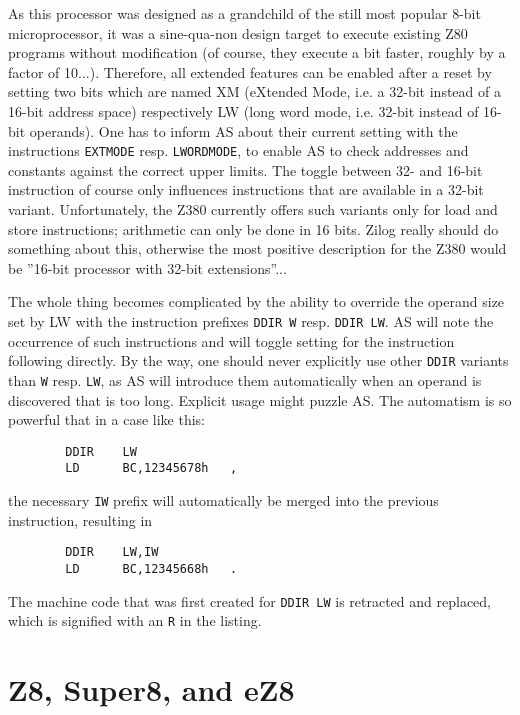 \documentclass[12pt,twoside]{report}
\newcommand{\tty}[1]{{\tt #1}}
\begin{document}
As this processor was designed as a grandchild of the still most popular
8-bit microprocessor, it was a sine-qua-non design target to execute
existing Z80 programs without modification (of course, they execute a bit
faster, roughly by a factor of 10...).  Therefore, all extended features
can be enabled after a reset by setting two bits which are named XM
(eXtended Mode, i.e. a 32-bit instead of a 16-bit address space)
respectively LW (long word mode, i.e. 32-bit instead of 16-bit operands).
One has to inform AS about their current setting with the instructions
\tty{EXTMODE} resp. \tty{LWORDMODE}, to enable AS to check addresses and
constants against the correct upper limits.  The toggle between 32- and
16-bit instruction of course only influences instructions that are
available in a 32-bit variant.  Unfortunately, the Z380 currently offers
such variants only for load and store instructions; arithmetic can only be
done in 16 bits.  Zilog really should do something about this, otherwise
the most positive description for the Z380 would be ''16-bit processor
with 32-bit extensions''...

The whole thing becomes complicated by the ability to override the operand
size set by LW with the instruction prefixes \tty{DDIR W} resp.
\tty{DDIR LW}.  AS will note the occurrence of such instructions and will
toggle setting for the instruction following directly.  By the way, one
should never explicitly use other \tty{DDIR} variants than \tty{W} resp.
\tty{LW}, as AS will introduce them automatically when an operand is
discovered that is too long.  Explicit usage might puzzle AS.  The
automatism is so powerful that in a case like this:
\begin{verbatim}
        DDIR    LW
        LD      BC,12345678h   ,
\end{verbatim}
the necessary \tty{IW} prefix will automatically be merged into the previous
instruction, resulting in
\begin{verbatim}
        DDIR    LW,IW
        LD      BC,12345668h   .
\end{verbatim}
The machine code that was first created for \tty{DDIR LW} is retracted and
replaced, which is signified with an \tty{R} in the listing.


\section{Z8, Super8, and eZ8}
\label{Z8Spec}
\end{document}
